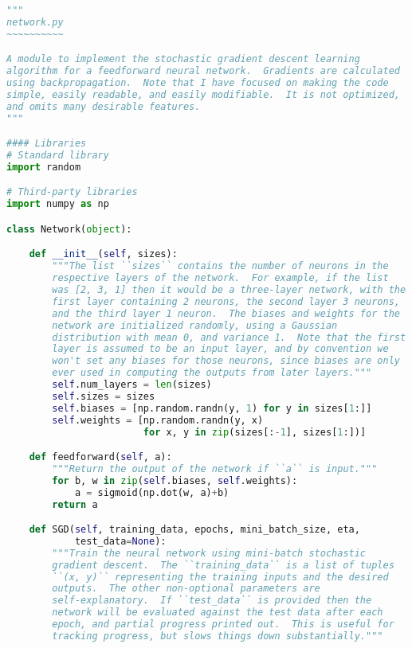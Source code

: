 \begin{fullwidth}
\begin{lstlisting}[caption={network.py (Python 3.7.1)},label={lst:network.py}, language=Python]
"""
network.py
~~~~~~~~~~

A module to implement the stochastic gradient descent learning
algorithm for a feedforward neural network.  Gradients are calculated
using backpropagation.  Note that I have focused on making the code
simple, easily readable, and easily modifiable.  It is not optimized,
and omits many desirable features.
"""

#### Libraries
# Standard library
import random

# Third-party libraries
import numpy as np

class Network(object):

    def __init__(self, sizes):
        """The list ``sizes`` contains the number of neurons in the
        respective layers of the network.  For example, if the list
        was [2, 3, 1] then it would be a three-layer network, with the
        first layer containing 2 neurons, the second layer 3 neurons,
        and the third layer 1 neuron.  The biases and weights for the
        network are initialized randomly, using a Gaussian
        distribution with mean 0, and variance 1.  Note that the first
        layer is assumed to be an input layer, and by convention we
        won't set any biases for those neurons, since biases are only
        ever used in computing the outputs from later layers."""
        self.num_layers = len(sizes)
        self.sizes = sizes
        self.biases = [np.random.randn(y, 1) for y in sizes[1:]]
        self.weights = [np.random.randn(y, x)
                        for x, y in zip(sizes[:-1], sizes[1:])]

    def feedforward(self, a):
        """Return the output of the network if ``a`` is input."""
        for b, w in zip(self.biases, self.weights):
            a = sigmoid(np.dot(w, a)+b)
        return a

    def SGD(self, training_data, epochs, mini_batch_size, eta,
            test_data=None):
        """Train the neural network using mini-batch stochastic
        gradient descent.  The ``training_data`` is a list of tuples
        ``(x, y)`` representing the training inputs and the desired
        outputs.  The other non-optional parameters are
        self-explanatory.  If ``test_data`` is provided then the
        network will be evaluated against the test data after each
        epoch, and partial progress printed out.  This is useful for
        tracking progress, but slows things down substantially."""


\end{lstlisting}
\end{fullwidth}
